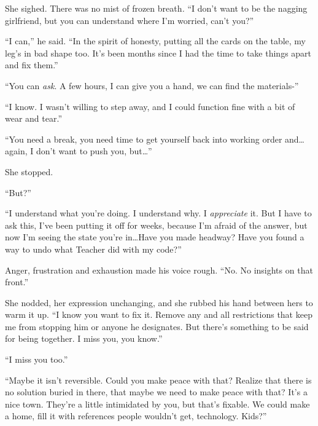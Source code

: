 She sighed.  There was no mist of frozen breath\emph{.  }``I don't want to be the nagging girlfriend, but you can understand where I'm worried, can't you?''



``I can,'' he said.  ``In the spirit of honesty, putting all the cards on the table, my leg's in bad shape too.  It's been months since I had the time to take things apart and fix them.''



``You can \emph{ask}.  A few hours, I can give you a hand, we can find the materials-''



``I know.  I wasn't willing to step away, and I could function fine with a bit of wear and tear.''



``You need a break, you need time to get yourself back into working order and\ldots again, I don't want to push you, but\ldots''



She stopped.



``But?''



``I understand what you're doing.  I understand why.  I \emph{appreciate} it.  But I have to ask this, I've been putting it off for weeks, because I'm afraid of the answer, but now I'm seeing the state you're in\ldots  Have you made headway?  Have you found a way to undo what Teacher did with my code?''



Anger, frustration and exhaustion made his voice rough.  ``No.  No insights on that front.''



She nodded, her expression unchanging, and she rubbed his hand between hers to warm it up.  ``I know you want to fix it.  Remove any and all restrictions that keep me from stopping him or anyone he designates.  But there's something to be said for being together.  I miss you, you know.''



``I miss you too.''



``Maybe it isn't reversible.  Could you make peace with that?  Realize that there is no solution buried in there, that maybe we need to make peace with that?  It's a nice town.  They're a little intimidated by you, but that's fixable.  We could make a home, fill it with references people wouldn't get, technology.  Kids?''



